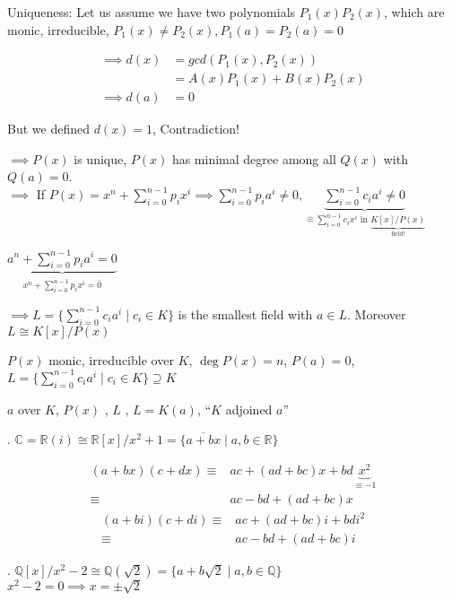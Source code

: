Uniqueness: Let us assume we have two polynomials $P_1(x) P_2(x)$, which are monic, irreducible, $P_1(x) \neq P_2(x), P_1(a) = P_2(a) = 0$

\begin{align*}
  \implies d(x) &= gcd(P_1(x), P_2(x))\\
                &= A(x) P_1(x) + B(x) P_2(x) \\
  \implies d(a) &= 0
\end{align*}

But we defined $d(x) = 1$, Contradiction!

$\implies P(x)$ is unique, $P(x)$ has minimal degree among all $Q(x)$ with $Q(a) = 0$. \\
$\implies$ If $P(x) = x^n + \sum_{i=0}^{n-1} p_i x^i \implies \sum_{i=0}^{n-1} p_i a^i \neq 0, \underbrace{\sum_{i=0}^{n-1} c_i a^i \neq 0}_{\hat{=} \sum_{i=0}^{n-1} c_i x^i \text{ in } \underbrace{K[x]/P(x)}_{\text{field!}}}$

$\underbrace{a^n + \sum_{i=0}^{n-1} p_i a^i = 0}_{\overline{x^n + \sum_{i=0}^{n-1} p_i x^i} = \bar{0}}$

$\implies L = \{ \sum_{i=0}^{n-1} c_i a^i \mid c_i \in K\}$ is the smallest field with $a \in L$. Moreover $L \cong K[x]/P(x)$

\begin{definition}
  $P(x)$ monic, irreducible over $K$, $\deg P(x) = n$, $P(a) = 0$,
  $L = \{ \sum_{i=0}^{n-1} c_i a^i\mid c_i \in K \} \supseteq K$

  $a$  over $K$, $P(x)$ , $L$ , $L = K(a)$, ``$K$ adjoined $a$''
\end{definition}

\Example.
$\mathbb{C} = \mathbb{R}(i) \cong \mathbb{R}[x] / x^2 +1 = \{\overline{a+bx} \mid a,b \in \mathbb{R} \}$

\begin{align*}
  (a + bx)(c+dx)
  \equiv & ac + (ad+bc)x + bd \underbrace{x^2}_{\equiv -1} \\
  \equiv & ac - bd + (ad+bc)x
\end{align*}
\begin{align*}
  (a + bi)(c+di)
  \equiv & ac + (ad+bc)i + bd i^2 \\
  \equiv & ac - bd + (ad+bc)i
\end{align*}

\Example.
$\mathbb{Q}[x] / x^2 -2 \cong \mathbb{Q}(\sqrt{2}) = \{ a+b \sqrt{2} \mid a,b \in \mathbb{Q}\}$ \\
$x^2-2 = 0 \implies x = \pm \sqrt{2}$

